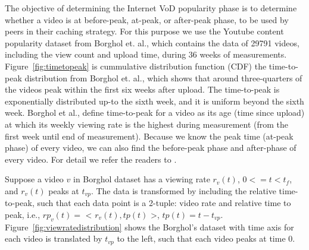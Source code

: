 \documentclass[10pt,final,journal,a4paper]{IEEEtran}
\begin{document}
The objective of determining the Internet VoD popularity phase is to determine whether a video is at before-peak, at-peak, or after-peak phase, to be used by peers in their caching strategy.
For this purpose we use the Youtube content popularity dataset from Borghol et. al.,\cite{Borghol:2011:CMP:2039452.2039717}  which contains the data of 29791 videos, including the view count and upload time, during 36 weeks of measurements.
Figure~\ref{fig:timetopeak} is cummulative distribution function (CDF) the time-to-peak distribution from Borghol et. al.,\cite{Borghol:2011:CMP:2039452.2039717}  which shows that around three-quarters of the videos peak within the first six weeks after upload.
The time-to-peak is exponentially distributed up-to the sixth week, and it is uniform beyond the sixth week.
Borghol et al., \cite{Borghol:2011:CMP:2039452.2039717} define time-to-peak for a video as its age (time since upload) at which its weekly viewing rate is the highest during measurement (from the first week until end of measurement).
Because we know the peak time (at-peak phase) of every video, we can also find the before-peak phase and after-phase of every video. 
For detail we refer the readers to \cite{Borghol:2011:CMP:2039452.2039717}.

Suppose a video $v$ in Borghol dataset has a viewing rate $r_v(t)$, $0 <= t < t_f$, and $r_v(t)$ peaks at $t_{vp}$.
The data is transformed by including the relative time-to-peak, such that each data point is a 2-tuple: video rate and relative time to peak, i.e., $rp_v(t) =$ < $r_v(t), tp(t)$ >, $tp(t) = t - t_{vp}$.
Figure~\ref{fig:viewratedistribution} shows the Borghol's dataset with time axis for each video is translated by $t_{vp}$ to the left, such that each video peaks at time $0$.


\end{document}
